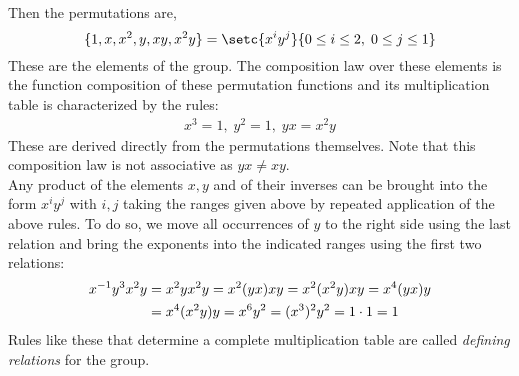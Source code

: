 \documentclass[MathsNotesBase.tex]{subfiles}
\begin{document}
{		Then the permutations are,
		\[ \{1, x, x^2, y, xy, x^2y\} = \setc{x^iy^j}{0 \leq i \leq 2,\; 0 \leq j \leq 1} \]
		These are the elements of the group. The composition law over these elements is the function composition of these permutation functions and its multiplication table is characterized by the rules:
		\begin{align*}
			x^3 = 1,\; y^2 = 1,\; yx = x^2y
		\end{align*}
		These are derived directly from the permutations themselves. Note that this composition law is not associative as $yx \neq xy$. \\
		Any product of the elements $x,y$ and of their inverses can be brought into the form $x^iy^j$ with $i,j$ taking the ranges given above by repeated application of the above rules. To do so, we move all occurrences of $y$  to the right side using the last relation and bring the exponents into the indicated ranges using the first two relations:
		\begin{align*} 
			{x}^{-1}y^3x^2y &= x^2yx^2y = x^2(yx)xy = x^2(x^2y)xy = x^4(yx)y\\
						&= x^4(x^2y)y = x^6y^2 = (x^3)^2y^2 = 1 \cdot 1 = 1
		\end{align*}
		Rules like these that determine a complete multiplication table are called \textit{defining relations} for the group.
	}
	
\end{document}
